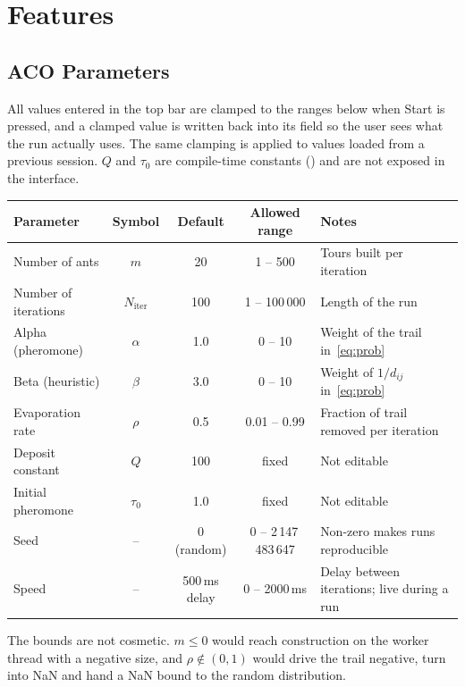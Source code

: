 \documentclass[11pt,a4paper]{article}
\begin{document}
\section{Features}

\subsection{ACO Parameters}
All values entered in the top bar are clamped to the ranges below when Start is pressed, and a clamped
value is written back into its field so the user sees what the run actually uses. The same clamping is
applied to values loaded from a previous session. $Q$ and $\tau_0$ are compile-time constants
() and are not exposed in the interface.

\begin{center}
\begin{tabularx}{\linewidth}{@{}l c c c L@{}}
\toprule
\textbf{Parameter} & \textbf{Symbol} & \textbf{Default} & \textbf{Allowed range} & \textbf{Notes} \\
\midrule
Number of ants & $m$ & 20 & 1 -- 500 & Tours built per iteration \\
Number of iterations & $N_{\text{iter}}$ & 100 & 1 -- 100\,000 & Length of the run \\
Alpha (pheromone) & $\alpha$ & 1.0 & 0 -- 10 & Weight of the trail in~\eqref{eq:prob} \\
Beta (heuristic) & $\beta$ & 3.0 & 0 -- 10 & Weight of $1/d_{ij}$ in~\eqref{eq:prob} \\
Evaporation rate & $\rho$ & 0.5 & 0.01 -- 0.99 & Fraction of trail removed per iteration \\
Deposit constant & $Q$ & 100 & fixed & Not editable \\
Initial pheromone & $\tau_0$ & 1.0 & fixed & Not editable \\
Seed & -- & 0 (random) & 0 -- 2\,147\,483\,647 & Non-zero makes runs reproducible \\
Speed & -- & 500\,ms delay & 0 -- 2000\,ms & Delay between iterations; live during a run \\
\bottomrule
\end{tabularx}
\end{center}

The bounds are not cosmetic. $m\le0$ would reach  construction on the worker thread with a
negative size, and $\rho\notin(0,1)$ would drive the trail negative, turn  into NaN and hand a
NaN bound to the random distribution.
\end{document}
